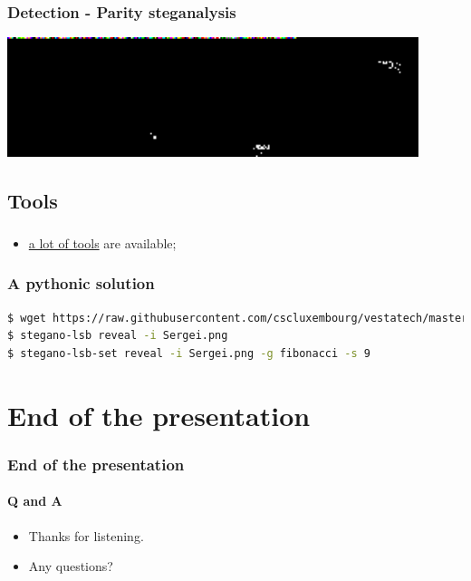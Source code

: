 \documentclass[]{beamer}
\begin{document}
\begin{frame}
\frametitle{Detection - Parity steganalysis}
\begin{center}
    \includegraphics[width=12.0cm]{./images/vesta_steg_zoom.png}
\end{center}
\end{frame}


\subsection{Tools}
\begin{frame}
\frametitle{}
\begin{itemize}
    \item \href{https://github.com/topics/steganography}{a lot of tools} are available;
\end{itemize}
\end{frame}

\begin{frame}[fragile]
\frametitle{A pythonic solution}
\begin{lstlisting}[language=Bash]
$ wget https://raw.githubusercontent.com/cscluxembourg/vestatech/master/challenges/sergei/Sergei.png
$ stegano-lsb reveal -i Sergei.png
$ stegano-lsb-set reveal -i Sergei.png -g fibonacci -s 9
\end{lstlisting}
\end{frame}




%
%
\section*{End of the presentation}
\begin{frame}
    \frametitle{End of the presentation}
    \framesubtitle{Q and A}
    \begin{center}
        \begin{itemize}
            \item Thanks for listening.
            \item Any questions?
        \end{itemize}
    \end{center}
\end{frame}
\end{document}
